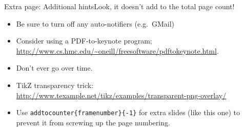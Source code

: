\addtocounter{framenumber}{-1}
\begin{frame}[c]{Extra page: Additional hints}{Look, it doesn't add to the total page count!}
	\begin{itemize}
		\item Be sure to turn off any auto-notifiers (e.g.\ GMail)
		\item Consider using a PDF-to-keynote program; \url{http://www.cs.hmc.edu/~oneill/freesoftware/pdftokeynote.html}.
		\item Don't ever go over time.
		\item TikZ transparency trick: \url{http://www.texample.net/tikz/examples/transparent-png-overlay/}
		\item Use \alert{\texttt{addtocounter\{framenumber\}\{-1\}}} for extra slides (like this one) to prevent it from screwing up the page numbering.
	\end{itemize}
\end{frame}

